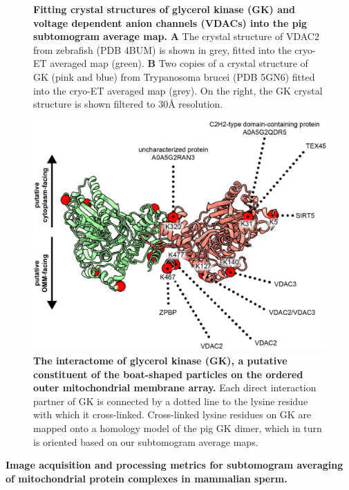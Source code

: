 \begin{subappendices}
\begin{figure}[hbt]
        \caption{\textbf{Fitting crystal structures of glycerol kinase (GK) and voltage dependent anion channels (VDACs) into the pig subtomogram average map.} \textbf{A} The crystal structure of VDAC2 from zebrafish (PDB 4BUM) is shown in grey, fitted into the cryo-ET averaged map (green). \textbf{B} Two copies of a crystal structure of GK (pink and blue) from Trypanosoma brucei (PDB 5GN6) fitted into the cryo-ET averaged map (grey). On the right, the GK crystal structure is shown filtered to 30Å resolution.}
        \label{fig:ch4_app_fig5}
    \end{figure}
    \begin{figure}[hbt]
        \center
        \includegraphics[]{Chapter.4/Figures/SI_Figure6.png}
        \caption{\textbf{The interactome of glycerol kinase (GK), a putative constituent of the boat-shaped particles on the ordered outer mitochondrial membrane array.} Each direct interaction partner of GK is connected by a dotted line to the lysine residue with which it cross-linked. Cross-linked lysine residues on GK are mapped onto a homology model of the pig GK dimer, which in turn is oriented based on our subtomogram average maps.}
        \label{fig:ch4_app_fig6}
    \end{figure}
    \begin{table}[hbt!]
        \caption{\textbf{Image acquisition and processing metrics for subtomogram averaging of mitochondrial protein complexes in mammalian
                sperm.}}

\end{table}
\end{subappendices}
